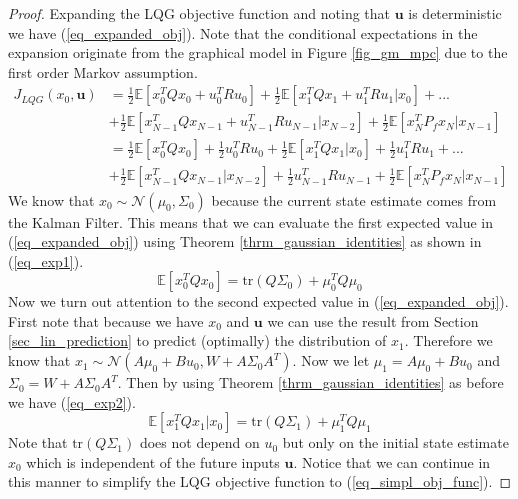 \begin{proof}
Expanding the LQG objective function and noting that $\mathbf{u}$ is deterministic we have (\ref{eq_expanded_obj}). Note that the conditional expectations in the expansion originate from the graphical model in Figure \ref{fig_gm_mpc} due to the first order Markov assumption. 
\begin{equation}
\begin{aligned}
J_{LQG}(x_0, \mathbf{u}) &= \frac{1}{2} \mathbb{E}\left[x_0^TQx_0 + u_0^TRu_0 \right] + \frac{1}{2} \mathbb{E}\left[x_1^TQx_1 + u_1^TRu_1 |x_0\right] + ... \\ &+ \frac{1}{2} \mathbb{E}\left[x_{N-1}^TQx_{N-1} + u_{N-1}^TRu_{N-1}|x_{N-2} \right] + \frac{1}{2} \mathbb{E}\left[x_N^TP_fx_N|x_{N-1} \right] \\
&= \frac{1}{2} \mathbb{E}\left[x_0^TQx_0\right] +\frac{1}{2} u_0^TRu_0 + \frac{1}{2} \mathbb{E}\left[x_1^TQx_1|x_0\right] + \frac{1}{2}u_1^TRu_1 + ... \\ &+ \frac{1}{2} \mathbb{E}\left[x_{N-1}^TQx_{N-1}|x_{N-2} \right]+ \frac{1}{2}u_{N-1}^TRu_{N-1} + \frac{1}{2} \mathbb{E}\left[x_N^TP_fx_N |x_{N-1}\right]
\end{aligned}
\label{eq_expanded_obj}
\end{equation}
We know that $x_0\sim \mathcal{N}(\mu_0, \Sigma_0)$ because the current state estimate comes from the Kalman Filter. This means that we can evaluate the first expected value in (\ref{eq_expanded_obj}) using Theorem \ref{thrm_gaussian_identities} as shown in (\ref{eq_exp1}).
\begin{equation}
\mathbb{E}\left[x_0^TQx_0\right] = \text{tr}(Q\Sigma_0) + \mu_0^TQ\mu_0
\label{eq_exp1}
\end{equation} 
Now we turn out attention to the second expected value in (\ref{eq_expanded_obj}). First note that because we have $x_0$ and $\mathbf{u}$ we can use the result from Section \ref{sec_lin_prediction} to predict (optimally) the distribution of $x_1$. Therefore we know that $x_1 \sim \mathcal{N}(A\mu_0+Bu_0, W+A\Sigma_0 A^T)$. Now we let $\mu_1 = A\mu_0+Bu_0$ and $\Sigma_0 = W+A\Sigma_0 A^T$. Then by using Theorem \ref{thrm_gaussian_identities} as before we have (\ref{eq_exp2}).
\begin{equation}
\mathbb{E}\left[x_1^TQx_1|x_0\right] = \text{tr}(Q\Sigma_1) + \mu_1^TQ\mu_1
\label{eq_exp2}
\end{equation} 
Note that $\text{tr}(Q\Sigma_1)$ does not depend on $u_0$ but only on the initial state estimate $x_0$ which is independent of the future inputs $\mathbf{u}$. Notice that we can continue in this manner to simplify the LQG objective function to (\ref{eq_simpl_obj_func}).

\end{proof}
